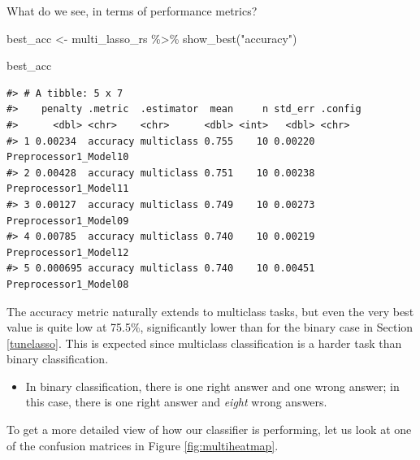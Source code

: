 \documentclass[
]{krantz}
\makeatletter
\newenvironment{Shaded}{\begin{snugshade}}{\end{snugshade}}
\newcommand{\FunctionTok}[1]{\textcolor[rgb]{0.00,0.00,0.00}{#1}}
\newcommand{\NormalTok}[1]{#1}
\newcommand{\OtherTok}[1]{\textcolor[rgb]{0.56,0.35,0.01}{#1}}
\newcommand{\SpecialCharTok}[1]{\textcolor[rgb]{0.00,0.00,0.00}{#1}}
\newcommand{\StringTok}[1]{\textcolor[rgb]{0.31,0.60,0.02}{#1}}
\newenvironment{kframe}{%
\medskip{}
\setlength{\fboxsep}{.8em}
 \def\at@end@of@kframe{}%
 \ifinner\ifhmode%
  \def\at@end@of@kframe{\end{minipage}}%
  \begin{minipage}{\columnwidth}%
 \fi\fi%
 \def\FrameCommand##1{\hskip\@totalleftmargin \hskip-\fboxsep
 \colorbox{shadecolor}{##1}\hskip-\fboxsep
     \hskip-\linewidth \hskip-\@totalleftmargin \hskip\columnwidth}%
 \MakeFramed {\advance\hsize-\width
   \@totalleftmargin\z@ \linewidth\hsize
   \@setminipage}}%
 {\par\unskip\endMakeFramed%
 \at@end@of@kframe}
\renewenvironment{Shaded}{\begin{kframe}}{\end{kframe}}
\newenvironment{rmdblock}[1]
  {\begin{shaded*}
  \begin{itemize}[left = -1cm, labelsep = 1cm]
  \renewcommand{\labelitemi}{
    \raisebox{-.7\height}[0pt][0pt]{
      {\setkeys{Gin}{width=3em,keepaspectratio}\texttt{[image: images/\#1]}}
    }
  }
 
  \item
  }
  {
  \end{itemize}
  \end{shaded*}
  }
\newenvironment{rmdwarning}
  {\begin{rmdblock}{warning}}
  {\end{rmdblock}}
\makeatother
\begin{document}
What do we see, in terms of performance metrics?

\begin{Shaded}
\begin{Highlighting}[]
\NormalTok{best\_acc }\OtherTok{\textless{}{-}}\NormalTok{ multi\_lasso\_rs }\SpecialCharTok{\%\textgreater{}\%}
  \FunctionTok{show\_best}\NormalTok{(}\StringTok{"accuracy"}\NormalTok{)}

\NormalTok{best\_acc}
\end{Highlighting}
\end{Shaded}

\begin{verbatim}
#> # A tibble: 5 x 7
#>    penalty .metric  .estimator  mean     n std_err .config              
#>      <dbl> <chr>    <chr>      <dbl> <int>   <dbl> <chr>                
#> 1 0.00234  accuracy multiclass 0.755    10 0.00220 Preprocessor1_Model10
#> 2 0.00428  accuracy multiclass 0.751    10 0.00238 Preprocessor1_Model11
#> 3 0.00127  accuracy multiclass 0.749    10 0.00273 Preprocessor1_Model09
#> 4 0.00785  accuracy multiclass 0.740    10 0.00219 Preprocessor1_Model12
#> 5 0.000695 accuracy multiclass 0.740    10 0.00451 Preprocessor1_Model08
\end{verbatim}

The accuracy metric naturally extends to multiclass tasks, but even the very best value is quite low at 75.5\%, significantly lower than for the binary case in Section \ref{tunelasso}. This is expected since multiclass classification is a harder task than binary classification.

\begin{rmdwarning}
In binary classification, there is one right answer and one wrong
answer; in this case, there is one right answer and \emph{eight} wrong
answers.
\end{rmdwarning}

To get a more detailed view of how our classifier is performing, let us look at one of the confusion matrices in Figure \ref{fig:multiheatmap}.
\end{document}
